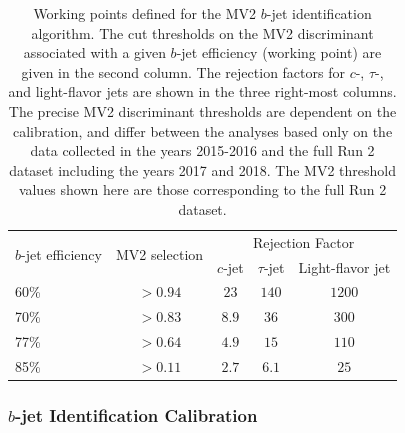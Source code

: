 \begin{table}[!htb]
    \caption{
        Working points defined for the MV2 $b$-jet identification algorithm.
        The cut thresholds on the MV2 discriminant associated with a given $b$-jet efficiency (working point)
        are given in the second column.
        The rejection factors for $c$-, $\tau$-, and light-flavor jets are shown in the three right-most columns.
        The precise MV2 discriminant thresholds are dependent on the calibration, and differ between the
        analyses based only on the data collected in the years 2015-2016 and the full Run 2 dataset
        including the years 2017 and 2018.
        The MV2 threshold values shown here are those corresponding to the full Run 2 dataset.
    }
    \label{tab:btag_wp}
    \begin{center}
        \begin{tabularx}{0.7\textwidth}{X|c|c|c|c}
        \hline
        \hline
        \multirow{2}{*}{$b$-jet efficiency} & \multirow{2}{*}{MV2 selection} & \multicolumn{3}{c}{Rejection Factor} \\
        \cline{3-5}
                &  & $c$-jet & $\tau$-jet & Light-flavor jet \\
        \hline
        60\%    & $>0.94$ & $23$ & $140$ & $1200$ \\
        70\%    & $>0.83$ & $8.9$ & $36$ & $300$ \\
        77\%    & $>0.64$ & $4.9$ & $15$ & $110$ \\
        85\%    & $>0.11$ & $2.7$ & $6.1$ & $25$ \\
        \hline
        \hline
        \end{tabularx}
    \end{center}
\end{table}

\subsubsection{$b$-jet Identification Calibration}
\label{sec:ftag_calib}

